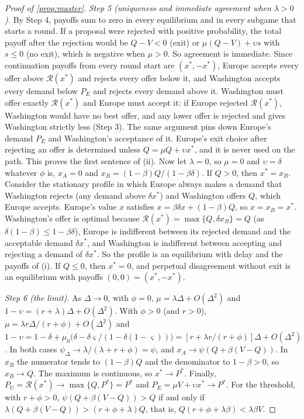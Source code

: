 \begin{proof}[Proof of \cref{prop:master}]
\emph{Step 5 (uniqueness and immediate agreement when $\lambda>0$).} By Step 4, payoffs sum to zero in every equilibrium and in every subgame that starts a round. If a proposal were rejected with positive probability, the total payoff after the rejection would be $Q-V<0$ (exit) or $\mu(Q-V)+\upsilon s$ with $s\le 0$ (no exit), which is negative when $\mu>0$. So agreement is immediate. Since continuation payoffs from every round start are $(x^*,-x^*)$, Europe accepts every offer above $\mathcal R(x^*)$ and rejects every offer below it, and Washington accepts every demand below $P_E$ and rejects every demand above it. Washington must offer exactly $\mathcal R(x^*)$ and Europe must accept it: if Europe rejected $\mathcal R(x^*)$, Washington would have no best offer, and any lower offer is rejected and gives Washington strictly less (Step 3). The same argument pins down Europe's demand $P_E$ and Washington's acceptance of it. Europe's exit choice after rejecting an offer is determined unless $Q=\mu Q+\upsilon x^*$, and it is never used on the path. This proves the first sentence of (ii).
Now let $\lambda=0$, so $\mu=0$ and $\upsilon=\delta$ whatever $\phi$ is, $x_A=0$ and $x_B=(1-\beta)Q/(1-\beta\delta)$. If $Q>0$, then $x^*=x_B$. Consider the stationary profile in which Europe always makes a demand that Washington rejects (any demand above $\delta x^*$) and Washington offers $Q$, which Europe accepts. Europe's value $x$ satisfies $x=\beta\delta x+(1-\beta)Q$, so $x=x_B=x^*$. Washington's offer is optimal because $\mathcal R(x^*)=\max\{Q,\delta x_B\}=Q$ (as $\delta(1-\beta)\le 1-\beta\delta$), Europe is indifferent between its rejected demand and the acceptable demand $\delta x^*$, and Washington is indifferent between accepting and rejecting a demand of $\delta x^*$. So the profile is an equilibrium with delay and the payoffs of (i). If $Q\le 0$, then $x^*=0$, and perpetual disagreement without exit is an equilibrium with payoffs $(0,0)=(x^*,-x^*)$.

\emph{Step 6 (the limit).} As $\Delta\to 0$, with $\phi=0$, $\mu=\lambda\Delta+O(\Delta^2)$ and $1-\upsilon=(r+\lambda)\Delta+O(\Delta^2)$. With $\phi>0$ (and $r>0$), $\mu=\lambda r\Delta/(r+\phi)+O(\Delta^2)$ and $1-\upsilon=1-\delta+\mu_0\big(\delta-\delta\varsigma/(1-\delta(1-\varsigma))\big)=[r+\lambda r/(r+\phi)]\Delta+O(\Delta^2)$. In both cases $\psi_\Delta\to\lambda/(\lambda+r+\phi)=\psi$, and $x_A\to\psi(Q+\beta(V-Q))$. In $x_B$ the numerator tends to $(1-\beta)Q$ and the denominator to $1-\beta>0$, so $x_B\to Q$. The maximum is continuous, so $x^*\to P^*$. Finally, $P_U=\mathcal R(x^*)\to\max\{Q,P^*\}=P^*$ and $P_E=\mu V+\upsilon x^*\to P^*$. For the threshold, with $r+\phi>0$, $\psi(Q+\beta(V-Q))>Q$ if and only if $\lambda(Q+\beta(V-Q))>(r+\phi+\lambda)Q$, that is, $Q(r+\phi+\lambda\beta)<\lambda\beta V$.
\end{proof}

